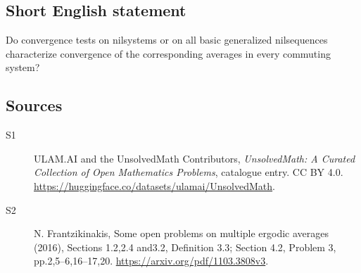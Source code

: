 \documentclass[11pt]{article}
\begin{document}
\subsection{Short English statement}
Do convergence tests on nilsystems or on all basic generalized nilsequences characterize convergence of the corresponding averages in every commuting system?
\subsection{Sources}
\begin{description}
\item[\hypertarget{source:statement:1}{S1}] ULAM.AI and the UnsolvedMath Contributors, \emph{UnsolvedMath: A Curated Collection of Open Mathematics Problems}, catalogue entry. CC BY 4.0. \url{https://huggingface.co/datasets/ulamai/UnsolvedMath}.
\item[\hypertarget{source:statement:2}{S2}] N. Frantzikinakis, Some open problems on multiple ergodic averages (2016), Sections 1.2,2.4 and3.2, Definition 3.3; Section 4.2, Problem 3, pp.2,5--6,16--17,20. \url{https://arxiv.org/pdf/1103.3808v3}.
\end{description}
\label{end:statement}
\end{document}
